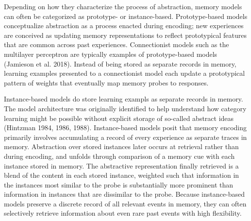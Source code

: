 \documentclass[
  letterpaper,
  DIV=11]{article}
\begin{document}
Depending on how they characterize the process of abstraction, memory
models can often be categorized as prototype- or instance-based.
Prototype-based models conceptualize abstraction as a process enacted
during encoding; new experiences are conceived as updating memory
representations to reflect prototypical features that are common across
past experiences. Connectionist models such as the multilayer perceptron
are typically examples of prototype-based models (Jamieson et al. 2018).
Instead of being stored as separate records in memory, learning examples
presented to a connectionist model each update a prototypical pattern of
weights that eventually map memory probes to responses.

Instance-based models do store learning exampls as separate records in
memory. The model architecture was originally identified to help
understand how category learning might be possible without explicit
storage of so-called abstract ideas (Hintzman 1984, 1986, 1988).
Instance-based models posit that memory encoding primarily involves
accumulating a record of every experience as separate traces in memory.
Abstraction over stored instances later occurs at retrieval rather than
during encoding, and unfolds through comparison of a memory cue with
each instance stored in memory. The abstractive representation finally
retrieved is a blend of the content in each stored instance, weighted
such that information in the instances most similar to the probe is
substantially more prominent than information in instances that are
dissimilar to the probe. Because instance-based models preserve a
discrete record of all relevant events in memory, they can often
selectively retrieve information about even rare past events with high
flexibility.
\end{document}
